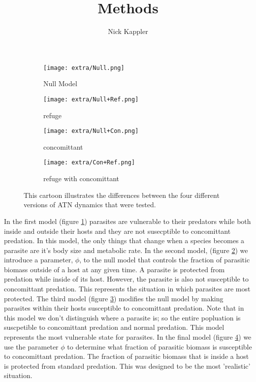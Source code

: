 \documentclass[11pt]{amsart}
\title{Methods}
\author{Nick Kappler}
\begin{document}
\begin{figure}
\begin{subfigure}{.45\textwidth} \caption{Null Model\label{subfig:modelsA}}
\texttt{[image: extra/Null.png]}
\end{subfigure}
\begin{subfigure}{.45\textwidth}
\caption{refuge\label{subfig:modelsB}}
\texttt{[image: extra/Null+Ref.png]}
\end{subfigure}

\begin{subfigure}{.45\textwidth}
\caption{concomittant\label{subfig:modelsC}}
\texttt{[image: extra/Null+Con.png]}
\end{subfigure}
\begin{subfigure}{.45\textwidth}
\caption{refuge with concomittant\label{subfig:modelsD}}
\texttt{[image: extra/Con+Ref.png]}
\end{subfigure}
\caption{This cartoon illustrates the differences between the four different versions of ATN dynamics that were tested.  \label{fig:cartoons}}
\end{figure}

In the first model (figure \ref{subfig:modelsA}) parasites are vulnerable to their predators while both inside and outside their hosts and they are not susecptible to concomittant predation.  In this model, the only things that change when a species becomes a parasite are it's body size and metabolic rate.  In the second model, (figure \ref{subfig:modelsB})  we introduce a parameter, $\phi$, to the null model that controls the fraction of parasitic biomass outside of a host at any given time.  A parasite is protected from predation while inside of its host.  However, the parasite is also not susceptible to concomittant predation.  This represents the situation in which parasites are most protected.  The third model (figure \ref{subfig:modelsC}) modifies the null model by making parasites within their hosts susceptible to concomittant predation.  Note that in this model we don't distinguish where a parasite is; so the entire popluation is suscpetible to concomittant predation and normal predation.  This model represents the most vulnerable state for parasites.  In the final model (figure \ref{subfig:modelsD}) we use the parameter $\phi$ to determine what fraction of parasitic biomass is susceptible to concomittant predation.  The fraction of parasitic biomass that is inside a host is protected from standard predation.  This was designed to be the most 'realistic' situation.
\end{document}
